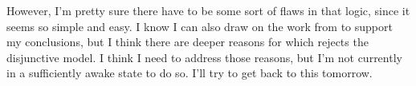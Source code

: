 \documentclass[a4paper,man,natbib]{apa6}
\begin{document}
However, I'm pretty sure there have to be some sort of flaws in that logic, since it seems so simple and easy. I know
I can also draw on the work from \cite{inglis_beauty_2015} to support my conclusions, but I think there are deeper
reasons for which \cite{todd_unmasking_2008} rejects the disjunctive model. I think I need to address those reasons,
but I'm not currently in a sufficiently awake state to do so. I'll try to get back to this tomorrow.


\end{document}
